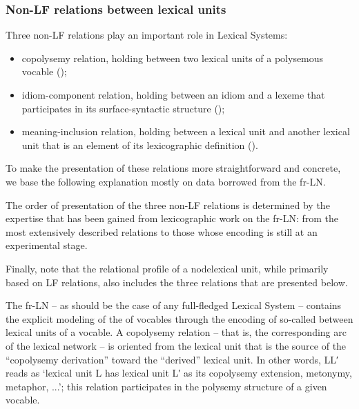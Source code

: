 \subsubsection{Non-LF relations between lexical units}\label{sec:non-LFRelationsInLSs}

Three non-LF relations play an important role in Lexical Systems:

\begin{itemize}

\item copolysemy relation, holding between two lexical units of a polysemous vocable ();

\item idiom-component relation, holding between an idiom and a lexeme that participates in its surface-syntactic structure ();

\item meaning-inclusion relation, holding between a lexical unit and another lexical unit that is an element of its lexicographic definition ().

\end{itemize}

To make the presentation of these relations more straightforward and concrete, we base the following explanation mostly on data borrowed from the fr-LN.

The order of presentation of the three non-LF relations is determined by the expertise that has been gained from lexicographic work on the fr-LN: from the most extensively described relations to those whose encoding is still at an experimental stage.

Finally, note that the relational profile of a node\slashs{}lexical unit, while primarily based on LF relations, also includes the three relations that are presented below.

\label{sec:copolysemyRelation}

The fr-LN -- as should be the case of any full-fledged Lexical System -- contains the explicit modeling of the  of vocables through the encoding of so-called  between lexical units of a vocable. A copolysemy relation -- that is, the corresponding arc of the lexical network -- is oriented from the lexical unit that is the source of the ``copolysemy derivation'' toward the ``derived'' lexical unit. In other words, L\thinspace{}\thinspace{}L′ reads as `lexical unit L has lexical unit L′ as its copolysemy extension, metonymy, metaphor, ...'; this relation participates in the polysemy structure of a given vocable.

